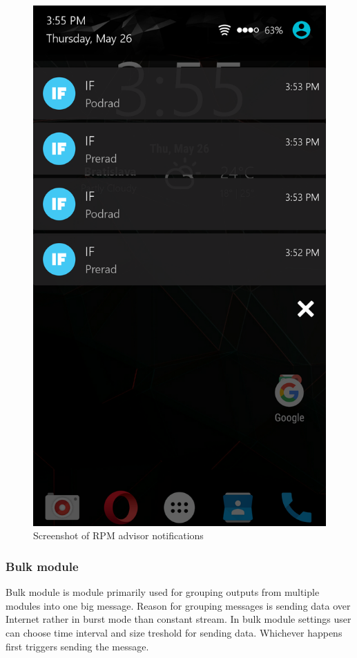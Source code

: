\begin{figure}[H]
\begin{center}
\captionsetup{font=small}
\includegraphics[scale=0.2]{pics/mobil_screen.png}
\caption{Screenshot of RPM advisor notifications}
\label{fig:mobile_screen}
\end{center}
\end{figure}
\subsubsection{Bulk module} %
Bulk module is module primarily used for grouping outputs from multiple modules into one big message. Reason for grouping messages is sending data over Internet rather in burst mode than constant stream. In bulk module settings user can choose time interval and size treshold for sending data. Whichever happens first triggers sending the message.
\label{ssub:bulk_module}
